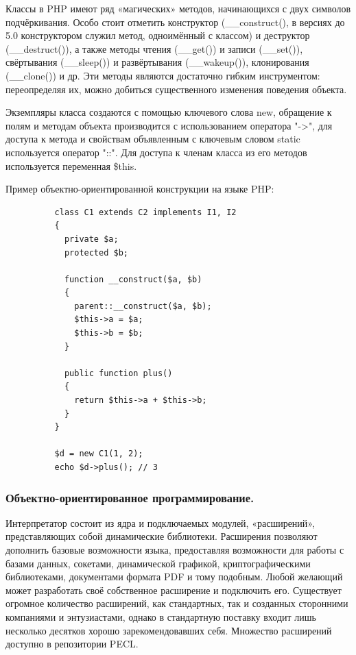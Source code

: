 Классы в PHP имеют ряд «магических» методов, начинающихся с двух символов подчёркивания. Особо стоит отметить конструктор (\_\_construct(), в версиях до 5.0 конструктором служил метод, одноимённый с классом) и деструктор (\_\_destruct()), а также методы чтения (\_\_get()) и записи (\_\_set()), свёртывания (\_\_sleep()) и развёртывания (\_\_wakeup()), клонирования (\_\_clone()) и др. Эти методы являются достаточно гибким инструментом: переопределяя их, можно добиться существенного изменения поведения объекта.

Экземпляры класса создаются с помощью ключевого слова new, обращение к полям и методам объекта производится с использованием оператора "->", для доступа к метода и свойствам объявленным с ключевым словом static используется оператор "::". Для доступа к членам класса из его методов используется переменная \$this.

Пример объектно-ориентированной конструкции на языке PHP: 
\begin{lstlisting}
          class C1 extends C2 implements I1, I2
          {
            private $a;
            protected $b;

            function __construct($a, $b)
            {
              parent::__construct($a, $b);
              $this->a = $a;
              $this->b = $b;
            }

            public function plus()
            {
              return $this->a + $this->b;
            }
          }

          $d = new C1(1, 2);
          echo $d->plus(); // 3
\end{lstlisting}

\subsubsection{Объектно-ориентированное программирование. }
\label{sub:practice:extebtions_php}
Интерпретатор состоит из ядра и подключаемых модулей, «расширений», представляющих собой динамические библиотеки. Расширения позволяют дополнить базовые возможности языка, предоставляя возможности для работы с базами данных, сокетами, динамической графикой, криптографическими библиотеками, документами формата PDF и тому подобным. Любой желающий может разработать своё собственное расширение и подключить его. Существует огромное количество расширений, как стандартных, так и созданных сторонними компаниями и энтузиастами, однако в стандартную поставку входит лишь несколько десятков хорошо зарекомендовавших себя. Множество расширений доступно в репозитории PECL.


